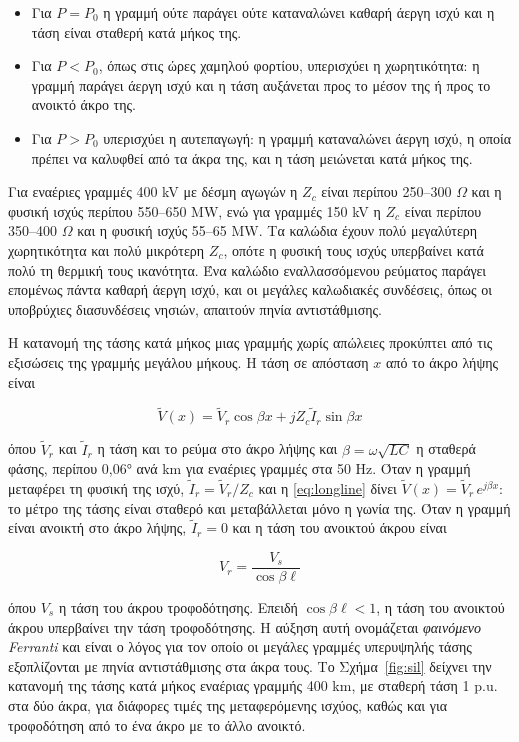 \begin{itemize}
\item Για $P = P_0$ η γραμμή ούτε παράγει ούτε καταναλώνει καθαρή άεργη ισχύ και η τάση είναι
      σταθερή κατά μήκος της.
\item Για $P < P_0$, όπως στις ώρες χαμηλού φορτίου, υπερισχύει η χωρητικότητα: η γραμμή
      παράγει άεργη ισχύ και η τάση αυξάνεται προς το μέσον της ή προς το ανοικτό άκρο της.
\item Για $P > P_0$ υπερισχύει η αυτεπαγωγή: η γραμμή καταναλώνει άεργη ισχύ, η οποία πρέπει
      να καλυφθεί από τα άκρα της, και η τάση μειώνεται κατά μήκος της.
\end{itemize}

Για εναέριες γραμμές 400 kV με δέσμη αγωγών η $Z_c$ είναι περίπου 250--300 $\Omega$ και η
φυσική ισχύς περίπου 550--650 MW, ενώ για γραμμές 150 kV η $Z_c$ είναι περίπου 350--400
$\Omega$ και η φυσική ισχύς 55--65 MW. Τα καλώδια έχουν πολύ μεγαλύτερη χωρητικότητα και πολύ
μικρότερη $Z_c$, οπότε η φυσική τους ισχύς υπερβαίνει κατά πολύ τη θερμική τους ικανότητα.
Ένα καλώδιο εναλλασσόμενου ρεύματος παράγει επομένως πάντα καθαρή άεργη ισχύ, και οι μεγάλες
καλωδιακές συνδέσεις, όπως οι υποβρύχιες διασυνδέσεις νησιών, απαιτούν πηνία αντιστάθμισης.

Η κατανομή της τάσης κατά μήκος μιας γραμμής χωρίς απώλειες προκύπτει από τις εξισώσεις της
γραμμής μεγάλου μήκους. Η τάση σε απόσταση $x$ από το άκρο λήψης είναι

\begin{equation}
\tilde{V}(x) = \tilde{V}_r \cos\beta x + j Z_c \tilde{I}_r \sin\beta x
\label{eq:longline}
\end{equation}

όπου $\tilde{V}_r$ και $\tilde{I}_r$ η τάση και το ρεύμα στο άκρο λήψης και
$\beta = \omega\sqrt{LC}$ η σταθερά φάσης, περίπου 0,06° ανά km για εναέριες γραμμές στα
50 Hz. Όταν η γραμμή μεταφέρει τη φυσική της ισχύ, $\tilde{I}_r = \tilde{V}_r / Z_c$ και η
\eqref{eq:longline} δίνει $\tilde{V}(x) = \tilde{V}_r\, e^{j\beta x}$: το μέτρο της τάσης
είναι σταθερό και μεταβάλλεται μόνο η γωνία της. Όταν η γραμμή είναι ανοικτή στο άκρο λήψης,
$\tilde{I}_r = 0$ και η τάση του ανοικτού άκρου είναι

\begin{equation}
V_r = \frac{V_s}{\cos\beta\ell}
\label{eq:ferranti}
\end{equation}

όπου $V_s$ η τάση του άκρου τροφοδότησης. Επειδή $\cos\beta\ell < 1$, η τάση του ανοικτού
άκρου υπερβαίνει την τάση τροφοδότησης. Η αύξηση αυτή ονομάζεται \emph{φαινόμενο Ferranti} και
είναι ο λόγος για τον οποίο οι μεγάλες γραμμές υπερυψηλής τάσης εξοπλίζονται με πηνία
αντιστάθμισης στα άκρα τους. Το Σχήμα~\ref{fig:sil} δείχνει την κατανομή της τάσης κατά μήκος
εναέριας γραμμής 400 km, με σταθερή τάση 1 p.u. στα δύο άκρα, για διάφορες τιμές της
μεταφερόμενης ισχύος, καθώς και για τροφοδότηση από το ένα άκρο με το άλλο ανοικτό.


